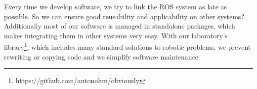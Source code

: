 Every time we develop software, we try to link the ROS system as late as possible. So we can ensure good reusability and applicability on other systems? Additionally most of our software is managed in standalone packages, which makes integrating them in other systems very easy. With our laboratory's library\footnote{https://github.com/autonohm/obviously}, which includes many standard solutions to robotic problems, we prevent rewriting or copying code and we simplify software maintenance.
